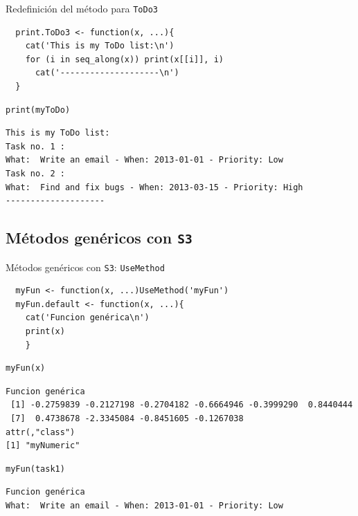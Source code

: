 \documentclass[xcolor={usenames,svgnames,dvipsnames}]{beamer}
\begin{document}
\begin{frame}[fragile,label={sec:orgheadline14}]{Redefinición del método para \texttt{ToDo3}}
 \lstset{language=R,label= ,caption= ,captionpos=b,numbers=none}
\begin{lstlisting}
  print.ToDo3 <- function(x, ...){
    cat('This is my ToDo list:\n')
    for (i in seq_along(x)) print(x[[i]], i)
      cat('--------------------\n')
  }
\end{lstlisting}

\lstset{language=R,label= ,caption= ,captionpos=b,numbers=none}
\begin{lstlisting}
print(myToDo)
\end{lstlisting}

\begin{verbatim}
This is my ToDo list:
Task no. 1 :
What:  Write an email - When: 2013-01-01 - Priority: Low 
Task no. 2 :
What:  Find and fix bugs - When: 2013-03-15 - Priority: High 
--------------------
\end{verbatim}
\end{frame}

\subsection{Métodos genéricos con \texttt{S3}}
\label{sec:orgheadline19}
\begin{frame}[fragile,label={sec:orgheadline16}]{Métodos genéricos con \texttt{S3}: \texttt{UseMethod}}
 \lstset{language=R,label= ,caption= ,captionpos=b,numbers=none}
\begin{lstlisting}
  myFun <- function(x, ...)UseMethod('myFun')
  myFun.default <- function(x, ...){
    cat('Funcion genérica\n')
    print(x)
    }
\end{lstlisting}

\lstset{language=R,label= ,caption= ,captionpos=b,numbers=none}
\begin{lstlisting}
myFun(x)
\end{lstlisting}

\begin{verbatim}
Funcion genérica
 [1] -0.2759839 -0.2127198 -0.2704182 -0.6664946 -0.3999290  0.8440444
 [7]  0.4738678 -2.3345084 -0.8451605 -0.1267038
attr(,"class")
[1] "myNumeric"
\end{verbatim}

\lstset{language=R,label= ,caption= ,captionpos=b,numbers=none}
\begin{lstlisting}
myFun(task1)
\end{lstlisting}

\begin{verbatim}
Funcion genérica
What:  Write an email - When: 2013-01-01 - Priority: Low
\end{verbatim}
\end{frame}
\end{document}

